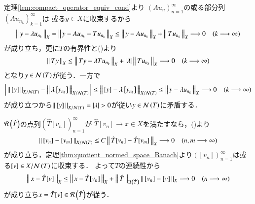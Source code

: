 \begin{prf}
\begin{description}
\begin{description}
						定理\ref{lem:compact_operator_equiv_cond}より
						$\left( Au_n \right)_{n=1}^{\infty}$の或る部分列$\left( Au_{n_k} \right)_{k=1}^{\infty}$は
						或る$y \in X$に収束するから
						\begin{align}
							\left\|\, y - \lambda u_{n_k}\, \right\|_{X} = \left\|\, y - Au_{n_k} - Tu_{n_k}\, \right\|_{X} \leq \left\|\, y - Au_{n_k}\, \right\|_{X} + \left\|\, Tu_{n_k}\, \right\|_{X}
							\longrightarrow 0 \quad (k \longrightarrow \infty)
						\end{align}
						が成り立ち，更に$T$の有界性と()より
						\begin{align}
							\left\|\, Ty\, \right\|_{X} \leq \left\|\, Ty - \lambda Tu_{n_k}\, \right\|_{X} + |\lambda| \left\|\, Tu_{n_k}\, \right\|_{X} \longrightarrow 0
							\quad (k \longrightarrow \infty)
						\end{align}
						となり$y \in \mathcal{N}\left( T \right)$が従う．一方で
						\begin{align}
							\left|\, \Norm{[y]}{X/\Ker{T}} - \Norm{\lambda \left[y_{n_k}\right]}{X/\Ker{T}}\, \right| 
							\leq \Norm{[y] - \lambda \left[y_{n_k}\right]}{X/\Ker{T}} %
							\leq \Norm{y - \lambda u_{n_k}}{X} \longrightarrow 0 \quad (k \longrightarrow \infty)
						\end{align}
						が成り立つから$\left\|\, [y]\, \right\|_{X/\mathcal{N}\left( T \right)} = |\lambda| > 0$が従い$y \in \mathcal{N}\left( T \right)$に矛盾する．
				\end{description}
				$\mathcal{R}\left( \hat{T} \right)$の点列$\left( \hat{T}[v_n] \right)_{n=1}^{\infty}$が
				$\hat{T}[v_n] \rightarrow x \in X$を満たすなら，()より
				\begin{align}
					\left\|\, [v_n] - [v_m]\, \right\|_{X/\mathcal{N}\left( T \right)} \leq C \left\|\, \hat{T}[v_n] - \hat{T}[v_m]\, \right\|_{X} \longrightarrow 0
					\quad (n,m \longrightarrow \infty)
				\end{align}
				が成り立ち，定理\ref{thm:quotient_normed_space_Banach}より$\left( [v_n] \right)_{n=1}^{\infty}$は或る$[v] \in X/\mathcal{N}\left( T \right)$に収束する．
				よって$\hat{T}$の連続性から
				\begin{align}
					\left\|\, x - \hat{T}[v]\, \right\|_{X} 
					\leq \left\|\, x - \hat{T}[v_n]\, \right\|_{X} + \left\|\, \hat{T}\, \right\|_{\mathrm{B}\left(\hat{T}\right)} \left\|\, [v_n] - [v]\, \right\|_{X}
					\longrightarrow 0 \quad (n \longrightarrow \infty)
				\end{align}
				が成り立ち$x = \hat{T}[v] \in \mathcal{R}\left( \hat{T} \right)$が従う．
			

\end{description}
\end{prf}
